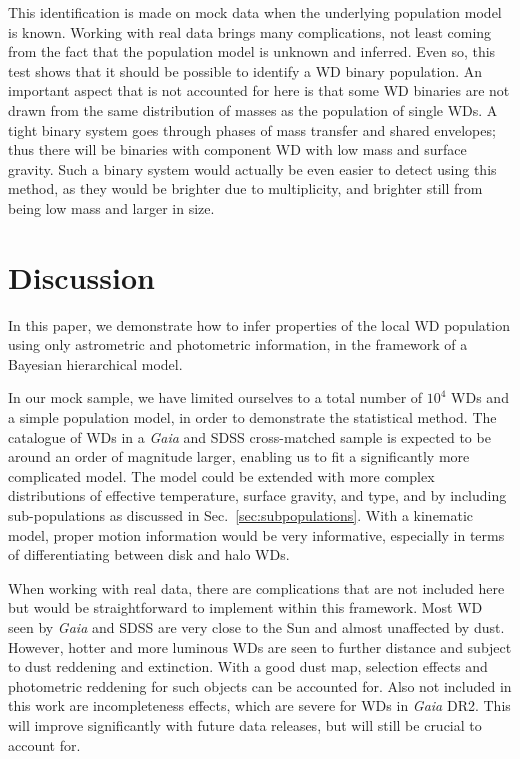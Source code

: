 \documentclass[fleqn,usenatbib]{mnras}
\begin{document}
This identification is made on mock data when the underlying population model is known. Working with real data brings many complications, not least coming from the fact that the population model is unknown and inferred. Even so, this test shows that it should be possible to identify a WD binary population. An important aspect that is not accounted for here is that some WD binaries are not drawn from the same distribution of masses as the population of single WDs. A tight binary system goes through phases of mass transfer and shared envelopes; thus there will be binaries with component WD with low mass and surface gravity. Such a binary system would actually be even easier to detect using this method, as they would be brighter due to multiplicity, and brighter still from being low mass and larger in size.







\section{Discussion}\label{sec:discussion}

In this paper, we demonstrate how to infer properties of the local WD population using only astrometric and photometric information, in the framework of a Bayesian hierarchical model.

In our mock sample, we have limited ourselves to a total number of $10^4$ WDs and a simple population model, in order to demonstrate the statistical method. The catalogue of WDs in a \emph{Gaia} and SDSS cross-matched sample is expected to be around an order of magnitude larger, enabling us to fit a significantly more complicated model. The model could be extended with more complex distributions of effective temperature, surface gravity, and type, and by including sub-populations as discussed in Sec.~\ref{sec:subpopulations}. With a kinematic model, proper motion information would be very informative, especially in terms of differentiating between disk and halo WDs.

When working with real data, there are complications that are not included here but would be straightforward to implement within this framework. Most WD seen by \emph{Gaia} and SDSS are very close to the Sun and almost unaffected by dust. However, hotter and more luminous WDs are seen to further distance and subject to dust reddening and extinction. With a good dust map, selection effects and photometric reddening for such objects can be accounted for. Also not included in this work are incompleteness effects, which are severe for WDs in \emph{Gaia} DR2. This will improve significantly with future data releases, but will still be crucial to account for.
\end{document}
